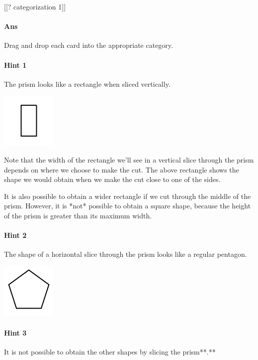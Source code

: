 \documentclass[twocolumn,10pt]{article}
\def\shrinkfactor{0.4}
\begin{document}
[[? categorization 1]]

\paragraph{Ans} Drag and drop each card into the appropriate category. 

\paragraph{Hint 1}The prism looks like a rectangle when sliced vertically.  

\includegraphics[scale=\shrinkfactor]{figures/225bc3d058cebe2059fc56f78ef80b5f3e0f2da7.png}

Note that the width of the rectangle we'll see in a vertical slice through the prism depends on where we choose to make the cut. The above rectangle shows the shape we would obtain when we make the cut close to one of the sides. 

It is also possible to obtain a wider rectangle if we cut through the middle of the prism. However, it is *not* possible to obtain a square shape, because the height of the prism is greater than its maximum width.

\paragraph{Hint 2}The shape of a horizontal slice through the prism looks like a regular pentagon.  

\includegraphics[scale=\shrinkfactor]{figures/498a6b09730fdba2360826c138eeee142e8cccc1.png}

\paragraph{Hint 3}It is not possible to obtain the other shapes by slicing the prism**.**
\end{document}
